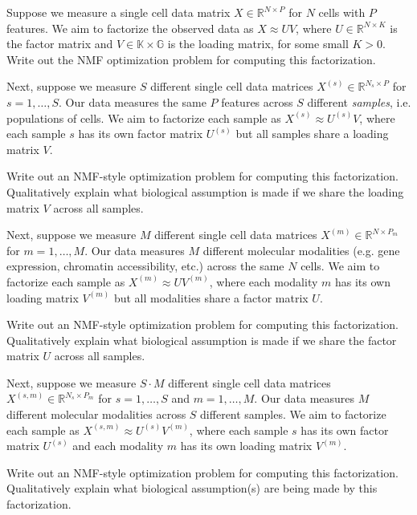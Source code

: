 \documentclass[12pt]{article}
\begin{document}
\begin{subquestions}
\item
Suppose we measure a single cell data matrix $X \in \mathbb{R}^{N \times P}$ for $N$ cells with $P$ features. We aim to factorize the observed data as $X \approx UV$, where $U \in \mathbb{R}^{N\times K}$ is the factor matrix and $V\in \mathbb{K \times G}$ is the loading matrix, for some small $K>0$.
Write out the NMF optimization problem for computing this factorization.

\item
Next, suppose we measure $S$ different single cell data matrices $X^{(s)} \in \mathbb{R}^{N_s \times P}$ for $s=1,\dots,S$. Our data measures the same $P$ features across $S$ different \emph{samples}, i.e. populations of cells.
We aim to factorize each sample as $X^{(s)} \approx U^{(s)} V$, where each sample $s$ has its own factor matrix $U^{(s)}$ but all samples share a loading matrix $V$.

Write out an NMF-style optimization problem for computing this factorization. Qualitatively explain what biological assumption is made if we share the loading matrix $V$ across all samples.

\item
Next, suppose we measure $M$ different single cell data matrices $X^{(m)} \in \mathbb{R}^{N \times P_m}$ for $m=1,\dots,M$. Our data measures $M$ different molecular modalities (e.g. gene expression, chromatin accessibility, etc.) across the same $N$ cells.
We aim to factorize each sample as $X^{(m)} \approx U V^{(m)}$, where each modality $m$ has its own loading matrix $V^{(m)}$ but all modalities share a factor matrix $U$.

Write out an NMF-style optimization problem for computing this factorization. Qualitatively explain what biological assumption is made if we share the factor matrix $U$ across all samples.

\item
Next, suppose we measure $S\cdot M$ different single cell data matrices $X^{(s,m)} \in \mathbb{R}^{N_s \times P_m}$ for $s=1,\dots,S$ and $m=1,\dots,M$. Our data measures $M$ different molecular modalities across $S$ different samples.
We aim to factorize each sample as $X^{(s,m)} \approx U^{(s)} V^{(m)}$, where each sample $s$ has its own factor matrix $U^{(s)}$ and each modality $m$ has its own loading matrix $V^{(m)}$.

Write out an NMF-style optimization problem for computing this factorization. Qualitatively explain what biological assumption(s) are being made by this factorization.


\end{subquestions}
\end{document}
